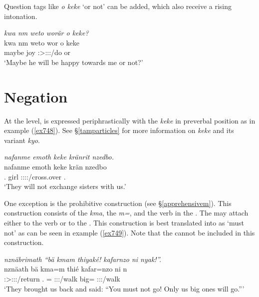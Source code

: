 Question tags like \emph{o keke} `or not' can be added, which also receive a rising intonation.

\begin{exe}
	\ex \emph{kwa nm weto worär o keke?}\\
	\gll kwa nm weto wor o keke\\
	\Fut{} maybe joy \Stsg:\Sbj>\Fsg:\Obj:\Nonpast:\Ipfv/do or \Neg{}\\
	\trans `Maybe he will be happy towards me or not?'
	\label{ex705}
\end{exe}

\section{Negation}\label{negationclause}

At the  level,  is expressed periphrastically with the  \emph{keke} in preverbal position as in example (\ref{ex748}). See \S\ref{tamparticles} for more information on \emph{keke} and its variant \emph{kyo}.

\begin{exe}
	\ex \emph{nafanme emoth keke kränrit nzedbo.}\\
	\gll nafanme emoth keke krän nzedbo\\
	\Tpl.\Poss{} girl \Neg{} \Stsg:\Sbj:\Irr:\Pfv:\Venit/cross.over \Fnsg.\All\\
	\trans `They will not exchange sisters with us.'
	\label{ex748}
\end{exe}

One exception is the prohibitive construction (see \S\ref{apprehensivem}). This construction consists of the   \emph{kma}, the   \emph{m=}, and the verb in the . The   may attach either to the verb or to the  . This construction is best translated into  as `must not' as can be seen in example (\ref{ex749}). Note that the  cannot be included in this construction.

\begin{exe}
	\ex \emph{nznäbrimath ``bä kmam thiyaké! kafarnzo ni nyak!''.}\\
	\gll nznäath bä kma=m thié kafar=nzo ni n\\
	\Stpl:\Sbj>\Fpl:\Obj:\Pst:\Pfv/return \Second.\Abs{} \Pot=\Appr{} \Spl:\Sbj:\Imp:\Ipfv/walk big=\Only{} \Fnsg{} \Fpl:\Sbj:\Nonpast:\Ipfv/walk\\
	\trans `They brought us back and said: ``You must not go! Only us big ones will go.'''
	\label{ex749}
\end{exe}


